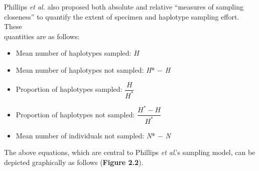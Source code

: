   
Phillips \textit{et al.} \cite{phillips2015exploration} also proposed both absolute and relative ``measures of sampling closeness'' to quantify the extent of specimen and haplotype sampling effort. These \\ quantities are as follows:

\begin{itemize}

\item Mean number of haplotypes sampled: $H$

\vspace{1mm}

\item Mean number of haplotypes not sampled: \textit{H}* $-$ \textit{H}

\vspace{1mm}

\item Proportion of haplotypes sampled: $\dfrac{H}{H^*}$

\vspace{1mm}

\item Proportion of haplotypes not sampled: $\dfrac{H^*-H}{H^*}$

\vspace{1mm}

\item Mean number of individuals not sampled: \textit{N}* $-$ \textit{N}

\end{itemize}

\vspace{1mm}

\noindent The above equations, which are central to Phillips \textit{et al}.'s \cite{phillips2015exploration} sampling model, can be depicted graphically as follows (\textbf{Figure 2.2}).

